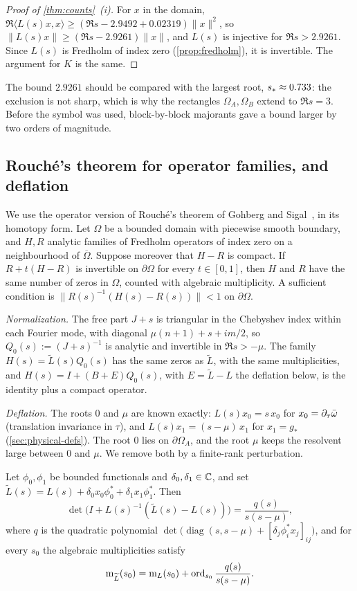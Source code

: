 \begin{proof}[Proof of \cref{thm:counts}~(i)]
For $x$ in the domain, $\Re\langle L(s)x,x\rangle\ge(\Re s-2.9492+0.02319)\|x\|^2$, so
$\|L(s)x\|\ge(\Re s-2.9261)\|x\|$, and $L(s)$ is injective for $\Re s>2.9261$. Since $L(s)$ is Fredholm of
index zero (\cref{prop:fredholm}), it is invertible. The argument for $K$ is the same.
\end{proof}

The bound $2.9261$ should be compared with the largest root, $s_{\ast}\approx0.733$: the exclusion is not sharp,
which is why the rectangles $\Omega_A,\Omega_B$ extend to $\Re s=3$. Before the symbol was used, block-by-block
majorants gave a bound larger by two orders of magnitude.

\subsection{Rouch\'e's theorem for operator families, and deflation}\label{sec:counting-rouche}

We use the operator version of Rouch\'e's theorem of Gohberg and Sigal~\cite{GohbergSigal1971}, in its
homotopy form. Let $\Omega$ be a bounded domain with piecewise smooth boundary, and $H,R$ analytic families of
Fredholm operators of index zero on a neighbourhood of $\overline\Omega$. Suppose moreover that $H-R$ is compact. If
$R+t(H-R)$ is invertible on $\partial\Omega$ for every $t\in[0,1]$, then $H$ and $R$ have the same number of zeros in $\Omega$, counted with
algebraic multiplicity. A sufficient condition is $\|R(s)^{-1}(H(s)-R(s))\|<1$ on $\partial\Omega$.

\emph{Normalization.} The free part $J+s$ is triangular in the Chebyshev index within each Fourier mode, with
diagonal $\mu(n+1)+s+im/2$, so $Q_0(s):=(J+s)^{-1}$ is analytic and invertible in $\Re s>-\mu$. The family
$H(s)=\widetilde L(s)Q_0(s)$ has the same zeros as $\widetilde L$, with the same multiplicities, and
$H(s)=I+(B+E)Q_0(s)$, with $E=\widetilde L-L$ the deflation below, is the identity plus a compact operator.

\emph{Deflation.} The roots $0$ and $\mu$ are known exactly: $L(s)x_0=s\,x_0$ for $x_0=\partial_\tau\bar\omega$
(translation invariance in $\tau$), and $L(s)x_1=(s-\mu)\,x_1$ for $x_1=g_*$ (\cref{sec:physical-defs}). The
root $0$ lies on $\partial\Omega_A$, and the root $\mu$ keeps the resolvent large between $0$ and $\mu$. We
remove both by a finite-rank perturbation.

\begin{lemma}\label{lem:brauer}
Let $\phi_0,\phi_1$ be bounded functionals and $\delta_0,\delta_1\in\mathbb{C}$, and set
$\widetilde L(s)=L(s)+\delta_0x_0\phi_0^*+\delta_1x_1\phi_1^*$. Then
\[
  \det\big(I+L(s)^{-1}(\widetilde L(s)-L(s))\big)=\frac{q(s)}{s(s-\mu)},
\]
where $q$ is the quadratic polynomial $\det\big(\operatorname{diag}(s,s-\mu)+[\delta_j\phi_i^*x_j]_{ij}\big)$, and
for every $s_0$ the algebraic multiplicities satisfy
\[
  \operatorname{m}_{\widetilde L}(s_0)=\operatorname{m}_L(s_0)+\operatorname{ord}_{s_0}\frac{q(s)}{s(s-\mu)} .
\]
\end{lemma}

